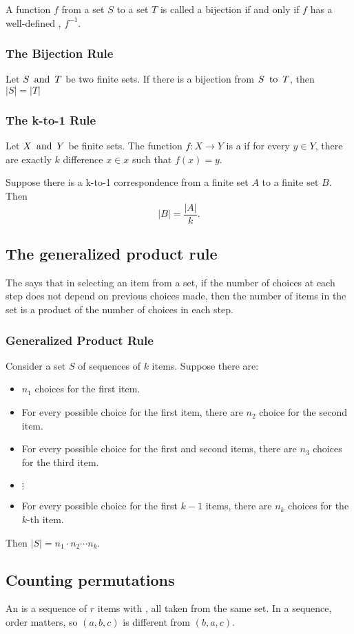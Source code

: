 A function $f$ from a set $S$ to a set $T$ is called a bijection if and only if $f$ has a well-defined , $f^{-1}$.

\subsubsection*{The Bijection Rule}
Let $S \operatorname{~\text{and}~} T$ be two finite sets. If there is a bijection from $S \operatorname{~\text{to}~} T$, then $|S|=|T|$

\subsubsection*{The k-to-1 Rule}
Let $X \operatorname{~\text{and}~} Y$ be finite sets. The function $f: X \rightarrow Y$ is a  if for every $y \in Y$, there are exactly $k$ difference $x \in x$ such that $f(x) = y$.

Suppose there is a k-to-1 correspondence from a finite set $A$ to a finite set $B$. Then
\[
  |B| = \frac{|A|}{k}.
\]

\subsection{The generalized product rule}
The  says that in selecting an item from a set, if the number of choices at each step does not depend on previous choices made, then the number of items in the set is a product of the number of choices in each step.

\subsubsection*{Generalized Product Rule}
Consider a set $S$ of sequences of $k$ items. Suppose there are:
\begin{itemize}
  \item $n_1$ choices for the first item.
  \item For every possible choice for the first item, there are $n_2$ choice for the second item.
  \item For every possible choice for the first and second items, there are $n_3$ choices for the third item.
  \item $\vdots$
  \item For every possible choice for the first $k-1$ items, there are $n_k$ choices for the $k$-th item.
\end{itemize}
Then $|S| = n_1 \cdot n_2 \cdots n_k$.

\subsection{Counting permutations}
An  is a sequence of $r$ items with , all taken from the same set. In a sequence, order matters, so $(a,b,c)$ is different from $(b,a,c)$.


